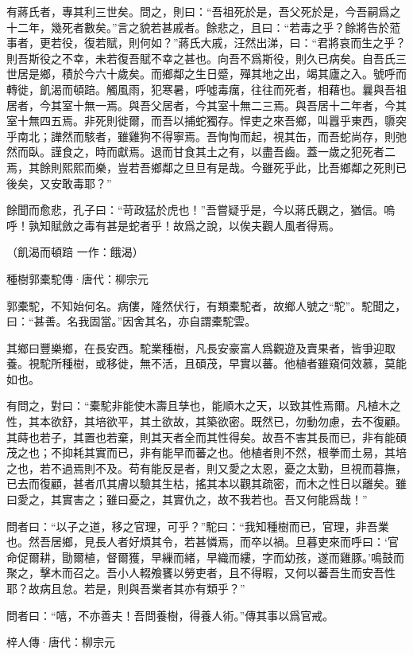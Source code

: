 \documentclass[12pt,a4paper]{ctexbook}
\begin{document}
有蔣氏者，專其利三世矣。問之，則曰：“吾祖死於是，吾父死於是，今吾嗣爲之十二年，幾死者數矣。”言之貌若甚戚者。餘悲之，且曰：“若毒之乎？餘將告於蒞事者，更若役，復若賦，則何如？”蔣氏大戚，汪然出涕，曰：“君將哀而生之乎？則吾斯役之不幸，未若復吾賦不幸之甚也。向吾不爲斯役，則久已病矣。自吾氏三世居是鄉，積於今六十歲矣。而鄉鄰之生日蹙，殫其地之出，竭其廬之入。號呼而轉徙，飢渴而頓踣。觸風雨，犯寒暑，呼噓毒癘，往往而死者，相藉也。曩與吾祖居者，今其室十無一焉。與吾父居者，今其室十無二三焉。與吾居十二年者，今其室十無四五焉。非死則徙爾，而吾以捕蛇獨存。悍吏之來吾鄉，叫囂乎東西，隳突乎南北；譁然而駭者，雖雞狗不得寧焉。吾恂恂而起，視其缶，而吾蛇尚存，則弛然而臥。謹食之，時而獻焉。退而甘食其土之有，以盡吾齒。蓋一歲之犯死者二焉，其餘則熙熙而樂，豈若吾鄉鄰之旦旦有是哉。今雖死乎此，比吾鄉鄰之死則已後矣，又安敢毒耶？”\par
餘聞而愈悲，孔子曰：“苛政猛於虎也！”吾嘗疑乎是，今以蔣氏觀之，猶信。嗚呼！孰知賦斂之毒有甚是蛇者乎！故爲之說，以俟夫觀人風者得焉。\par
（飢渴而頓踣 一作：餓渴）\par
種樹郭橐駝傳·唐代：柳宗元 \par
郭橐駝，不知始何名。病僂，隆然伏行，有類橐駝者，故鄉人號之“駝”。駝聞之，曰：“甚善。名我固當。”因舍其名，亦自謂橐駝雲。\par
其鄉曰豐樂鄉，在長安西。駝業種樹，凡長安豪富人爲觀遊及賣果者，皆爭迎取養。視駝所種樹，或移徙，無不活，且碩茂，早實以蕃。他植者雖窺伺效慕，莫能如也。\par
有問之，對曰：“橐駝非能使木壽且孳也，能順木之天，以致其性焉爾。凡植木之性，其本欲舒，其培欲平，其土欲故，其築欲密。既然已，勿動勿慮，去不復顧。其蒔也若子，其置也若棄，則其天者全而其性得矣。故吾不害其長而已，非有能碩茂之也；不抑耗其實而已，非有能早而蕃之也。他植者則不然，根拳而土易，其培之也，若不過焉則不及。苟有能反是者，則又愛之太恩，憂之太勤，旦視而暮撫，已去而復顧，甚者爪其膚以驗其生枯，搖其本以觀其疏密，而木之性日以離矣。雖曰愛之，其實害之；雖曰憂之，其實仇之，故不我若也。吾又何能爲哉！”\par
問者曰：“以子之道，移之官理，可乎？”駝曰：“我知種樹而已，官理，非吾業也。然吾居鄉，見長人者好煩其令，若甚憐焉，而卒以禍。旦暮吏來而呼曰：‘官命促爾耕，勖爾植，督爾獲，早繅而緒，早織而縷，字而幼孩，遂而雞豚。’鳴鼓而聚之，擊木而召之。吾小人輟飧饔以勞吏者，且不得暇，又何以蕃吾生而安吾性耶？故病且怠。若是，則與吾業者其亦有類乎？”\par
問者曰：“嘻，不亦善夫！吾問養樹，得養人術。”傳其事以爲官戒。\par
梓人傳·唐代：柳宗元 \par
\end{document}
